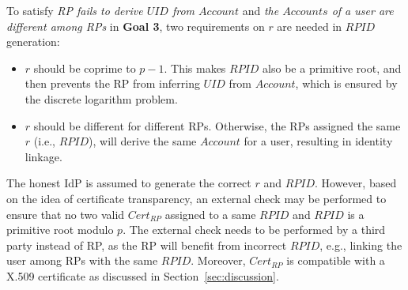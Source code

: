 To satisfy \emph{RP fails to derive $UID$ from $Account$} and \emph{the $Accounts$ of a user are different among RPs} in \textbf{Goal 3}, two requirements on $r$ are needed  in $RPID$ generation:
\begin{itemize}
  \item $r$ should be coprime to $p-1$. This makes $RPID$ also be  a primitive root, and then prevents the RP from inferring $UID$ from $Account$, which is  ensured by the discrete logarithm problem.
  
  \item  $r$ should be different for different RPs. Otherwise, the RPs assigned the same $r$ (i.e., $RPID$), will derive the same $Account$ for a user, resulting in identity linkage. %
\end{itemize}

The honest IdP is assumed to generate the correct $r$ and $RPID$. 
However, based on the idea of certificate transparency, 
an external check may be performed to ensure that  no two valid $Cert_{RP}$ assigned to a same $RPID$ and $RPID$ is a primitive root modulo $p$.
The external check needs to be performed by a third party instead of RP, as the RP will benefit from incorrect $RPID$, e.g., linking the user among RPs with the same  $RPID$.
Moreover, $Cert_{RP}$ is compatible with a X.509 certificate as discussed in Section~\ref{sec:discussion}.




